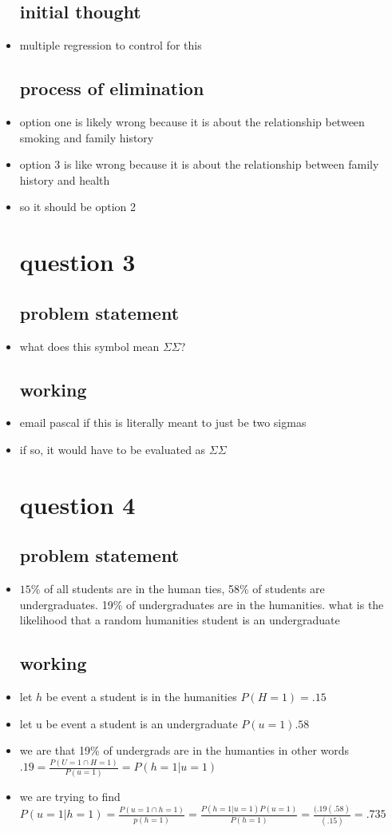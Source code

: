 \documentclass{article}
\begin{document}
\begin{itemize}
\subsection{initial thought}
\item multiple regression to control for this 
\subsection{process of elimination}
\item option one is likely wrong because it is about the relationship between smoking and family history 
\item option 3 is like wrong because it is about the relationship between family history and health 
\item so it should be option 2

\section{question 3}
\subsection{problem statement}
\item what does this symbol mean $\Sigma\Sigma$?
\subsection{working}
\item email pascal if this is literally meant to just be two sigmas 
\item if so, it would have to be evaluated as $\Sigma\Sigma$


\section{question 4}
\subsection{problem statement}
\item $15\%$ of all students are in the human ties, 58\% of students are undergraduates. 19\% of undergraduates are in the humanities. what is the likelihood that a random humanities student is an undergraduate
\subsection{working }
\item let $h$ be event a student is in the humanities $P(H=1)=.15$
\item let u be event a student is an undergraduate $P(u=1).58$
\item we are that 19\% of undergrads are in the humanties in other words $.19=\frac{P(U=1\cap H=1)}{P(u=1)}=P(h=1|u=1)$
\item we are trying to find $P(u=1|h=1)=\frac{P(u=1\cap h=1)}{p(h=1)}=\frac{P(h=1|u=1)P(u=1)}{P(h=1)}=\frac{(.19(.58)}{(.15)}=.735$



\end{itemize}
\end{document}
